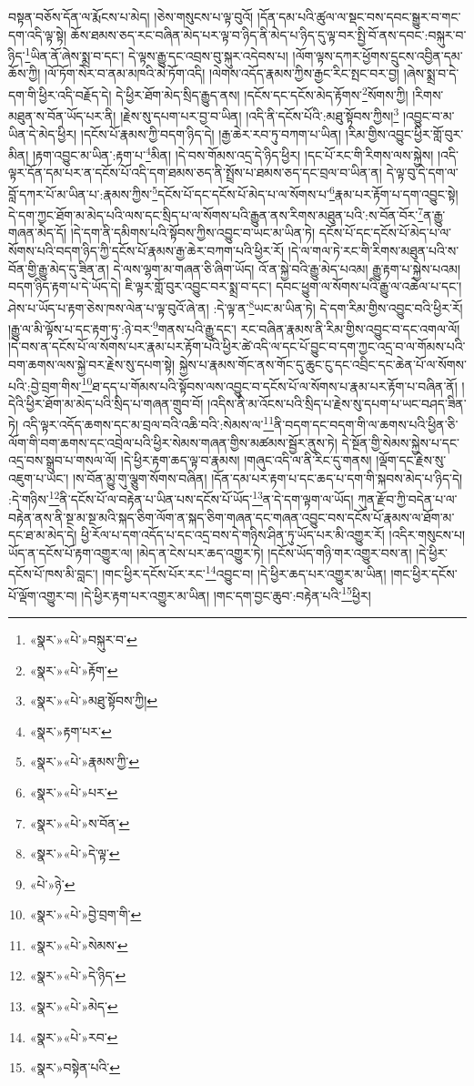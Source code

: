 བསྟན་བཅོས་དོན་ལ་རྨོངས་པ་མེད། །ཅེས་གསུངས་པ་ལྟ་བུའོ། །དོན་དམ་པའི་ཚུལ་ལ་སྡང་བས་དབང་སྒྱུར་བ་གང་དག་འདི་ལྟ་སྟེ། ཆོས་ཐམས་ཅད་རང་བཞིན་མེད་པར་ལྟ་བ་ཉིད་ནི་མེད་པ་ཉིད་དུ་ལྟ་བར་སྤྱི་བོ་ནས་དབང་:བསྐུར་བ་ཉིད་\footnote{«སྣར་»«པེ་»བསྐུར་བ་}ཡིན་ནོ་ཞེས་སྨྲ་བ་དང་། དེ་ལྟས་རྒྱུ་དང་འབྲས་བུ་སྐུར་འདེབས་པ། །ལོག་ལྟས་དཀར་ཕྱོགས་དྲུངས་འབྱིན་དམ་ཆོས་ཀྱི། །ལོ་ཏོག་སེར་བ་ནམ་མཁའི་མེ་ཏོག་འདི། །ལེགས་འདོད་རྣམས་ཀྱིས་རྒྱང་རིང་སྤང་བར་བྱ། །ཞེས་སྨྲ་བ་དེ་དག་གི་ཕྱིར་འདི་བརྗོད་དེ། དེ་ཕྱིར་ཐོག་མེད་སྲིད་རྒྱུད་ནས། །དངོས་དང་དངོས་མེད་རྟོགས་\footnote{«སྣར་»«པེ་»རྟོག་}སོགས་ཀྱི། །རིགས་མཐུན་ས་བོན་ཡོད་པར་ནི། །རྗེས་སུ་དཔག་པར་བྱ་བ་ཡིན། །འདི་ནི་དངོས་པོའི་:མཐུ་སྟོབས་ཀྱིས།\footnote{«སྣར་»«པེ་»མཐུ་སྟོབས་ཀྱི།} །འབྱུང་བ་མ་ཡིན་དེ་མེད་ཕྱིར། །དངོས་པོ་རྣམས་ཀྱི་བདག་ཉིད་དེ། །རྒྱ་ཆེར་རབ་ཏུ་བཀག་པ་ཡིན། །རིམ་གྱིས་འབྱུང་ཕྱིར་གློ་བུར་མིན། །རྟག་འབྱུང་མ་ཡིན་:རྟག་པ་\footnote{«སྣར་»རྟག་པར་}མིན། །དེ་བས་གོམས་འདྲ་དེ་ཉིད་ཕྱིར། །དང་པོ་རང་གི་རིགས་ལས་སྐྱེས། །འདི་ལྟར་དོན་དམ་པར་ན་དངོས་པོ་འདི་དག་ཐམས་ཅད་ནི་སྤྲོས་པ་ཐམས་ཅད་དང་བྲལ་བ་ཡིན་ན། དེ་ལྟ་བུ་དེ་དག་ལ་བློ་དཀར་པོ་མ་ཡིན་པ་:རྣམས་ཀྱིས་\footnote{«སྣར་»«པེ་»རྣམས་ཀྱི་}དངོས་པོ་དང་དངོས་པོ་མེད་པ་ལ་སོགས་པ་\footnote{«སྣར་»«པེ་»པར་}རྣམ་པར་རྟོག་པ་དག་འབྱུང་སྟེ། དེ་དག་ཀྱང་ཐོག་མ་མེད་པའི་ལས་དང་སྲིད་པ་ལ་སོགས་པའི་རྒྱུན་ནས་རིགས་མཐུན་པའི་:ས་བོན་བོར་\footnote{«སྣར་»«པེ་»ས་བོན་}ན་རྒྱུ་གཞན་མེད་དོ། །དེ་དག་ནི་དམིགས་པའི་སྟོབས་ཀྱིས་འབྱུང་བ་ཡང་མ་ཡིན་ཏེ། དངོས་པོ་དང་དངོས་པོ་མེད་པ་ལ་སོགས་པའི་བདག་ཉིད་ཀྱི་དངོས་པོ་རྣམས་རྒྱ་ཆེར་བཀག་པའི་ཕྱིར་རོ། །དེ་ལ་གལ་ཏེ་རང་གི་རིགས་མཐུན་པའི་ས་བོན་གྱི་རྒྱུ་མེད་དུ་ཟིན་ན། དེ་ལས་ལྷག་མ་གཞན་ཅི་ཞིག་ཡོད། འོ་ན་སྐྱེ་བའི་རྒྱུ་མེད་པའམ། རྒྱུ་རྟག་པ་སྐྱེས་པའམ། བདག་ཉིད་རྟག་པ་དེ་ཡོད་དེ། ཇི་ལྟར་གློ་བུར་འབྱུང་བར་སྨྲ་བ་དང་། དབང་ཕྱུག་ལ་སོགས་པའི་རྒྱུ་ལ་འཆེལ་པ་དང་། ཤེས་པ་ཡོད་པ་རྟག་ཅེས་ཁས་ལེན་པ་ལྟ་བུའོ་ཞེ་ན། :དེ་ལྟ་ན་\footnote{«སྣར་»«པེ་»དེ་ལྟ་}ཡང་མ་ཡིན་ཏེ། དེ་དག་རིམ་གྱིས་འབྱུང་བའི་ཕྱིར་རོ། །རྒྱུ་ལ་མི་ལྟོས་པ་དང་རྟག་ཏུ་:ཉེ་བར་\footnote{«པེ་»ཉེ་}གནས་པའི་རྒྱུ་དང་། རང་བཞིན་རྣམས་ནི་རིམ་གྱིས་འབྱུང་བ་དང་འགལ་ལོ། །དེ་བས་ན་དངོས་པོ་ལ་སོགས་པར་རྣམ་པར་རྟོག་པའི་ཕྱིར་ཚེ་འདི་ལ་དང་པོ་བྱུང་བ་དག་ཀྱང་འདྲ་བ་ལ་གོམས་པའི་བག་ཆགས་ལས་སྐྱེ་བར་རྗེས་སུ་དཔག་སྟེ། སྐྱེས་པ་རྣམས་གོང་ནས་གོང་དུ་ཆུང་ངུ་དང་འབྲིང་དང་ཆེན་པོ་ལ་སོགས་པའི་:བྱེ་བྲག་གིས་\footnote{«སྣར་»«པེ་»བྱེ་བྲག་གི་}ཐ་དད་པ་གོམས་པའི་སྟོབས་ལས་འབྱུང་བ་དངོས་པོ་ལ་སོགས་པ་རྣམ་པར་རྟོག་པ་བཞིན་ནོ། །དེའི་ཕྱིར་ཐོག་མ་མེད་པའི་སྲིད་པ་གཞན་གྲུབ་བོ། །འདིས་ནི་མ་འོངས་པའི་སྲིད་པ་རྗེས་སུ་དཔག་པ་ཡང་བཤད་ཟིན་ཏེ། འདི་ལྟར་འདོད་ཆགས་དང་མ་བྲལ་བའི་འཆི་བའི་:སེམས་ལ་\footnote{«སྣར་»«པེ་»སེམས་}ནི་བདག་དང་བདག་གི་ལ་ཆགས་པའི་ཕྱིན་ཅི་ལོག་གི་བག་ཆགས་དང་འབྲེལ་པའི་ཕྱིར་སེམས་གཞན་གྱིས་མཚམས་སྦྱོར་ནུས་ཏེ། དེ་སྔོན་གྱི་སེམས་སྐྱེས་པ་དང་འདྲ་བས་སྒྲུབ་པ་གསལ་ལོ། །དེ་ཕྱིར་རྟག་ཆད་ལྟ་བ་རྣམས། །གཞུང་འདི་ལ་ནི་རིང་དུ་གནས། །ལྡོག་དང་རྗེས་སུ་འཇུག་པ་ཡང་། །ས་བོན་མྱུ་གུ་ལྕུག་སོགས་བཞིན། །དོན་དམ་པར་རྟག་པ་དང་ཆད་པ་དག་གི་སྐབས་མེད་པ་ཉིད་དེ། :དེ་གཉིས་\footnote{«སྣར་»«པེ་»དེ་ཉིད་}ནི་དངོས་པོ་ལ་བརྟེན་པ་ཡིན་པས་དངོས་པོ་ཡོད་\footnote{«སྣར་»«པེ་»མེད་}ན་དེ་དག་ལྟག་ལ་ཡོད། ཀུན་རྫོབ་ཀྱི་བདེན་པ་ལ་བརྟེན་ནས་ནི་སྔ་མ་སྔ་མའི་སྐད་ཅིག་ལོག་ན་སྐད་ཅིག་གཞན་དང་གཞན་འབྱུང་བས་དངོས་པོ་རྣམས་ལ་ཐོག་མ་དང་ཐ་མ་མེད་དེ། ཕྱི་རོལ་པ་དག་འདོད་པ་དང་འདྲ་བས་དེ་གཉིས་ཤིན་ཏུ་ཡོད་པར་མི་འགྱུར་རོ། །འདིར་གསུངས་པ། ཡོད་ན་དངོས་པོ་རྟག་འགྱུར་ལ། །མེད་ན་ངེས་པར་ཆད་འགྱུར་ཏེ། །དངོས་ཡོད་གཉི་གར་འགྱུར་བས་ན། །དེ་ཕྱིར་དངོས་པོ་ཁས་མི་བླང་། །གང་ཕྱིར་དངོས་པོར་རང་\footnote{«སྣར་»«པེ་»རབ་}འབྱུང་བ། །དེ་ཕྱིར་ཆད་པར་འགྱུར་མ་ཡིན། །གང་ཕྱིར་དངོས་པོ་ལྡོག་འགྱུར་བ། །དེ་ཕྱིར་རྟག་པར་འགྱུར་མ་ཡིན། །གང་དག་བྱང་ཆུབ་:བརྟེན་པའི་\footnote{«སྣར་»བསྟེན་པའི་}ཕྱིར། 
